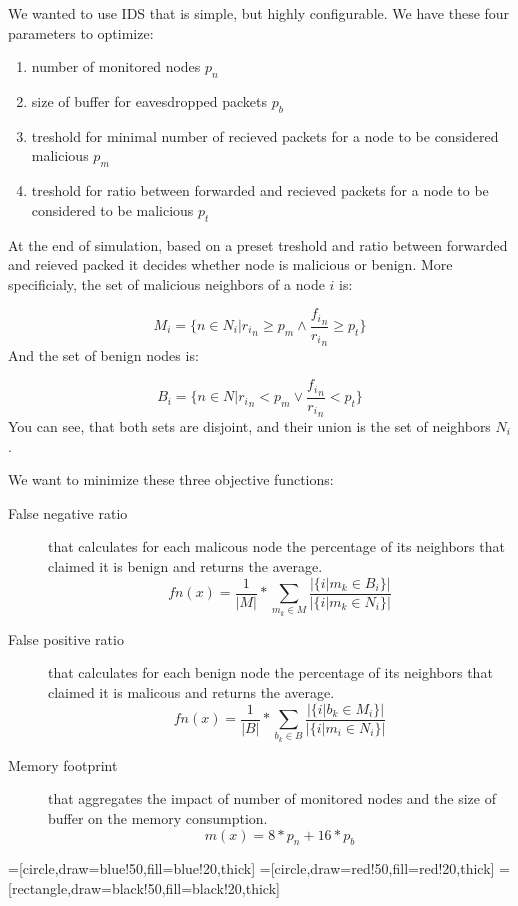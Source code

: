 \documentclass[12pt,oneside]{fithesis2}
\begin{document}
We wanted to use IDS that is simple, but highly configurable. 
We have these four parameters to optimize:
\begin{enumerate}
\item number of monitored nodes $p_n$
\item size of buffer for eavesdropped packets $p_b$
\item treshold for minimal number of recieved packets for a node to be considered malicious $p_m$
\item treshold for ratio between forwarded and recieved packets for a node to be considered to be malicious $p_t$
\end{enumerate}

At the end of simulation, based on a preset treshold and ratio between forwarded and reieved packed it decides whether node is malicious or benign. More specificialy, the set of malicious neighbors of a node $i$ is:

$$ M_i = \{n \in N_i|{r_i}_n \geq p_m \land \frac{{f_i}_n}{{r_i}_n} \geq p_t \} $$
And the set of benign nodes is:

$$B_i = \{n \in N|{r_i}_n < p_m \lor \frac{{f_i}_n}{{r_i}_n} < p_t \} $$
You can see, that both sets are disjoint, and their union is the set of neighbors $N_i$. 

We want to minimize these three objective functions:
\begin{description}
\item[False negative ratio] that calculates for each malicous node the percentage of its neighbors that claimed it is benign and returns the average.
$$fn(x) = \frac{1}{|M|}* \sum\limits_{m_k\in M} \frac{|\{i|m_k \in B_i\}|}{|\{i|m_k \in N_i\}|} $$
\item[False positive ratio] that calculates for each benign node the percentage of its neighbors that claimed it is malicous and returns the average.
$$fn(x) = \frac{1}{|B|}* \sum\limits_{b_k\in B} \frac{|\{i|b_k \in M_i\}|}{|\{i|m_i \in N_i\}|} $$
\item[Memory footprint] that aggregates the impact of number of monitored nodes and the size of buffer on the memory consumption.
$$m(x) = 8*p_n + 16*p_b $$
\end{description}

=[circle,draw=blue!50,fill=blue!20,thick]
=[circle,draw=red!50,fill=red!20,thick]
=[rectangle,draw=black!50,fill=black!20,thick]
\end{document}

